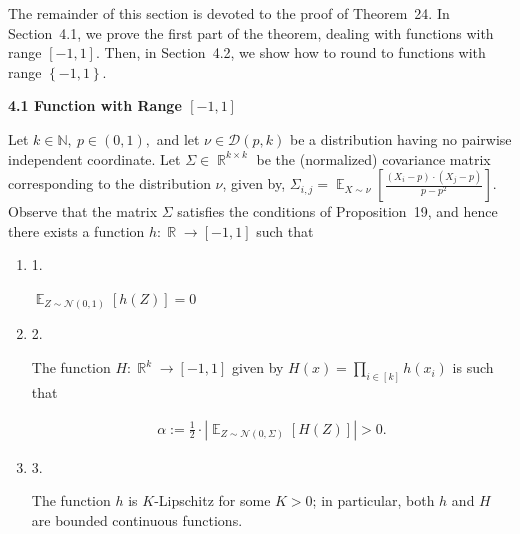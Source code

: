 \documentclass[10pt,a4paper]{article}
\begin{document}
The remainder of this section is devoted to the proof of Theorem 24.
In Section 4.1, we prove the first part of the theorem, dealing with functions with range $[-1,1]$.
Then, in Section 4.2, we show how to round to functions with range $\left\{-1,1\right\}$.\par




\par\medskip\noindent\textbf{
4.1 Function with Range $[-1,1]$
}\par




Let $k\in\mathbb{N},\ p\in(0,1),$ and let $\nu\in\mathcal{D}(p,k)$ be a distribution having no pairwise independent coordinate.
Let $\Sigma\in\mathop{\mathbb{R}}^{k\times k}$ be the (normalized) covariance matrix corresponding to the distribution $\nu$, given by, $\Sigma_{i,j}=\mathop{\mathbb{E}}_{X\sim\nu}\left[\frac{\left(X_{i}-p\right)\cdot\left(X_{j}-p\right)}{p-p^{2}}\right]$.
Observe that the matrix $\Sigma$ satisfies the conditions of Proposition 19, and hence there exists a function $h:\mathop{\mathbb{R}}\to[-1,1]$ such that\par


\begin{enumerate}


\item[] 
1. 


$\mathop{\mathbb{E}}_{Z\sim\mathcal{N}(0,1)}\left[h(Z)\right]=0$\par





\item[] 
2. 


The function $H:\mathop{\mathbb{R}}^{k}\to[-1,1]$ given by $H(x)=\prod_{i\in[k]}h\left(x_{i}\right)$ is such that\par


\[\begin{gathered}
\alpha:=\frac{1}{2}\cdot\left|\mathop{\mathbb{E}}_{Z\sim\mathcal{N}(0,\Sigma)}\left[H(Z)\right]\right|>0.
\end{gathered}\]





\item[] 
3. 


The function $h$ is $K$-Lipschitz for some $K>0$; in particular, both $h$ and $H$ are bounded continuous functions.\par





\end{enumerate}
\end{document}
